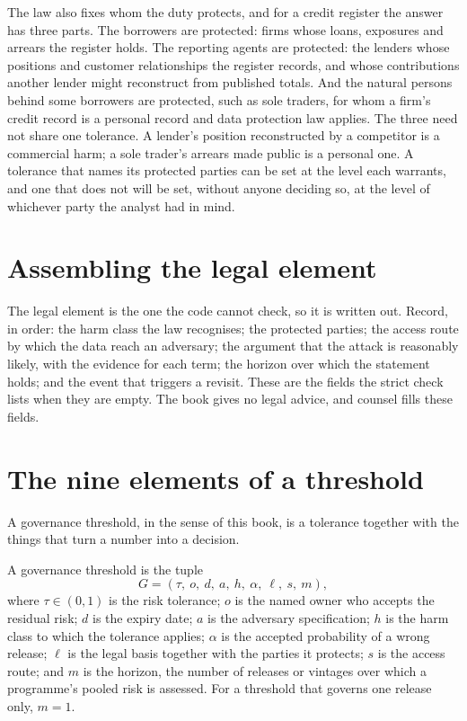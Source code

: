 The law also fixes whom the duty protects, and for a credit register the answer has
three parts. The borrowers are protected: firms whose loans, exposures and arrears
the register holds. The reporting agents are protected: the lenders whose positions
and customer relationships the register records, and whose contributions another
lender might reconstruct from published totals. And the natural persons behind
some borrowers are protected, such as sole traders, for whom a firm's credit record
is a personal record and data protection law applies. The three need not share one
tolerance. A lender's position reconstructed by a competitor is a commercial harm;
a sole trader's arrears made public is a personal one. A tolerance that names its
protected parties can be set at the level each warrants, and one that does not will
be set, without anyone deciding so, at the level of whichever party the analyst had
in mind.

\section{Assembling the legal element}\label{c07:sec-legal-assembly}

The legal element is the one the code cannot check, so it is written out. Record, in order: the harm class the law recognises; the protected parties; the access route by which the data reach an adversary; the argument that the attack is reasonably likely, with the evidence for each term; the horizon over which the statement holds; and the event that triggers a revisit. These are the fields the strict check lists when they are empty. The book gives no legal advice, and counsel fills these fields.

\section{The nine elements of a threshold}\label{c07:sec-elements}

A governance threshold, in the sense of this book, is a tolerance together with the
things that turn a number into a decision.

\begin{definition}\label{c07:def-thresh}
A governance threshold is the tuple
\begin{equation}\label{c07:eq-tuple}
G = (\tau,\ o,\ d,\ a,\ h,\ \alpha,\ \ell,\ s,\ m),
\end{equation}
where $\tau \in (0,1)$ is the risk tolerance; $o$ is the named owner who accepts
the residual risk; $d$ is the expiry date; $a$ is the adversary specification; $h$
is the harm class to which the tolerance applies; $\alpha$ is the accepted
probability of a wrong release; $\ell$ is the legal basis together with the parties
it protects; $s$ is the access route; and $m$ is the horizon, the number of releases
or vintages over which a programme's pooled risk is assessed. For a threshold that
governs one release only, $m = 1$.
\end{definition}

